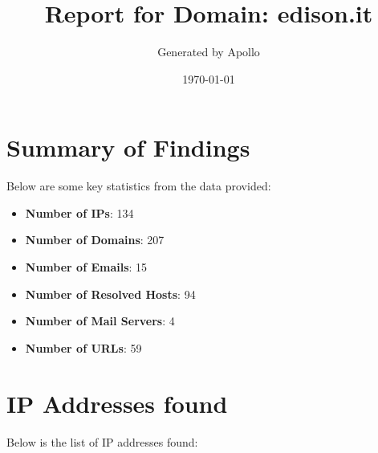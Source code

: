 \documentclass{article}
\title{Report for Domain: edison.it}
\author{Generated by Apollo}
\date{\today}
\begin{document}
\maketitle
\clearpage

\tableofcontents  %

\clearpage

\section{Summary of Findings}

Below are some key statistics from the data provided:

\begin{itemize}
    \item \textbf{Number of IPs}: 134
    \item \textbf{Number of Domains}: 207
    \item \textbf{Number of Emails}: 15
    \item \textbf{Number of Resolved Hosts}: 94
    \item \textbf{Number of Mail Servers}: 4
    \item \textbf{Number of URLs}: 59
\end{itemize}

\clearpage

\section{IP Addresses found}

Below is the list of IP addresses found:
\end{document}
